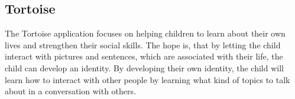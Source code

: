 \subsection{Tortoise}
\label{sub:tortoise}
The Tortoise application focuses on helping children to learn about their own lives and strengthen their social skills. The hope is, that by letting the child interact with pictures and sentences, which are associated with their life, the child can develop an identity. By developing their own identity, the child will learn how to interact with other people by learning what kind of topics to talk about in a conversation with others.